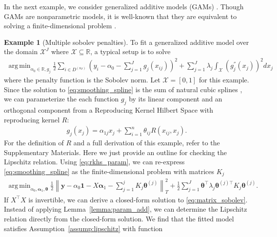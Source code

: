 \documentclass[12pt]{article} %
\theoremstyle{definition}
\newtheorem{example}{Example}
\DeclareMathOperator*{\argmin}{arg\,min}
\begin{document}
In the next example, we consider generalized additive models (GAMs) \citep{hastie1990generalized}.
Though GAMs are nonparametric models, it is well-known that they are equivalent to solving a finite-dimensional problem \citep{green1993nonparametric, o1986automatic, buja1989linear}.
\begin{example}[Multiple sobolev penalties]
	\label{example:sobolev}
	To fit a generalized additive model over the domain $\mathcal{X}^J$ where $\mathcal{X} \subseteq \mathbb{R}$, a typical setup is to solve
	\begin{align}
	\argmin_{\alpha_0 \in \mathbb{R}, g_j}
	\frac{1}{2} \sum_{i\in D^{(n_T)}}
	\left(
	y_i - \alpha_0 - \sum_{j=1}^J g_j(x_{ij})
	\right)^2
	+ \sum_{j=1}^{J} \lambda_j \int_{\mathcal{X}} \left(g_j^{''}(x_j)\right)^{2} dx_j
	\label{eq:smoothing_spline}
	\end{align}
	where the penalty function is the Sobolev norm.
	Let $\mathcal{X} = [0,1]$ for this example.
	Since the solution to \eqref{eq:smoothing_spline} is the sum of natural cubic splines \citep{buja1989linear}, we can parameterize the each function $g_j$ by its linear component and an orthogonal component from a Reproducing Kernel Hilbert Space with reproducing kernel $R$:
	\begin{align}
	g_j(x_j) = \alpha_{1j} x_j + \sum_{i=1}^n \theta_{ij} R(x_{ij}, x_j).
	\label{eq:rkhs_param}
	\end{align}
	For the definition of $R$ and a full derivation of this example, refer to the Supplementary Materials.
	Here we just provide an outline for checking the Lipschitz relation.
	Using \eqref{eq:rkhs_param}, we can re-express \eqref{eq:smoothing_spline} as the finite-dimensional problem with matrices $K_j$
	\begin{align}
	\argmin_{\alpha_0, \boldsymbol{\alpha}_1, \boldsymbol{\theta}}
	\frac{1}{2}
	\left \|
	\boldsymbol{y} -
	\alpha_0 \boldsymbol{1}
	- X \boldsymbol{\alpha}_1
	- \sum_{j=1}^j K_j \boldsymbol{\theta}^{(j)}
	\right \|^2_T
	+
	\frac{1}{2}
	\sum_{j = 1}^J
	\boldsymbol{\theta}^\top
	\lambda_j \boldsymbol{\theta}^{(j)\top} K_j \boldsymbol{\theta}^{(j)}.
	\label{eq:matrix_sobolev}
	\end{align}
	If $X^\top X$ is invertible, we can derive a closed-form solution to \eqref{eq:matrix_sobolev}.
	Instead of applying Lemma~\ref{lemma:param_add}, we can determine the Lipschitz relation directly from the closed-form solution.
	We find that the fitted model satisfies Assumption~\ref{assump:lipschitz} with function
	\begin{align}

\end{align}
\end{example}
\end{document}
